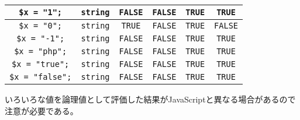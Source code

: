 \begin{table}[ht]
\begin{center}
\begin{tabular}{|*{6}{c|}}
\verb+$x = "1";+&\verb+string+&\verb+FALSE+&\verb+FALSE+&\verb+TRUE+&\verb+TRUE+\\\hline
\verb+$x = "0";+&\verb+string+&\verb+TRUE+&\verb+FALSE+&\verb+TRUE+&\verb+FALSE+\\\hline
\verb+$x = "-1";+&\verb+string+&\verb+FALSE+&\verb+FALSE+&\verb+TRUE+&\verb+TRUE+\\\hline
\verb+$x = "php";+&\verb+string+&\verb+FALSE+&\verb+FALSE+&\verb+TRUE+&\verb+TRUE+\\\hline
\verb+$x = "true";+&\verb+string+&\verb+FALSE+&\verb+FALSE+&\verb+TRUE+&\verb+TRUE+\\\hline
\verb+$x = "false";+&\verb+string+&\verb+FALSE+&\verb+FALSE+&\verb+TRUE+&\verb+TRUE+\\\hline
  \end{tabular}
\end{center}
\end{table}
いろいろな値を論理値として評価した結果がJavaScriptと異なる場合があるので
注意が必要である。

